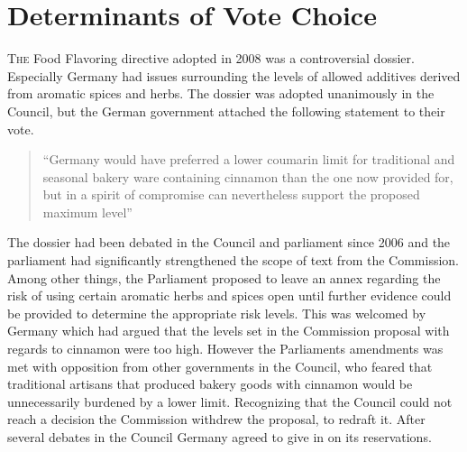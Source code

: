 
\chapter{Determinants of Vote Choice}
\label{chapter:votechoice}

\lettrine[lines = 3]{T}{he} Food Flavoring directive adopted in 2008 was a controversial dossier. Especially Germany had issues surrounding the levels of allowed additives derived from aromatic spices and herbs. The dossier was adopted unanimously in the Council, but the German government attached the following statement to their vote. 

\begin{quote}
  ``Germany would have preferred a lower coumarin limit for traditional and seasonal bakery ware containing cinnamon than the one now provided for, but in a spirit of compromise can nevertheless support the proposed maximum level''
\end{quote}

 The dossier had been debated in the Council and parliament since 2006 and the parliament had significantly strengthened the scope of text from the Commission. Among other things, the Parliament proposed to leave an annex regarding the risk of using certain aromatic herbs and spices open until further evidence could be provided to determine the appropriate risk levels. This was welcomed by Germany which had argued that the levels set in the Commission proposal with regards to cinnamon were too high. However the Parliaments amendments was met with opposition from other governments in the Council, who feared that traditional artisans that produced bakery goods with cinnamon would be unnecessarily burdened by a lower limit.  Recognizing that the Council could not reach a decision the Commission withdrew the proposal, to redraft it. After several debates in the Council Germany agreed to give in on its reservations. 

